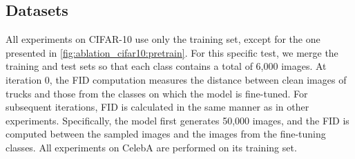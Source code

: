 \subsection{Datasets}
All experiments on CIFAR-10 \citep{Krizhevsky2009} use only the training set, except for the one presented in \cref{fig:ablation_cifar10:pretrain}. For this specific test, we merge the training and test sets so that each class contains a total of 6,000 images. At iteration 0, the FID computation measures the distance between clean images of trucks and those from the classes on which the model is fine-tuned. For subsequent iterations, FID is calculated in the same manner as in other experiments. Specifically, the model first generates 50,000 images, and the FID is computed between the sampled images and the images from the fine-tuning classes. All experiments on CelebA \citep{LiuLWT2015} are performed on its training set.

